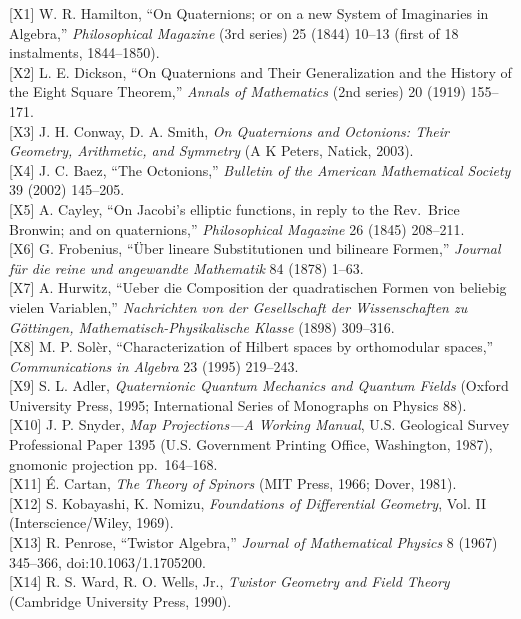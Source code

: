 \documentclass[
  a4paper,
]{article}
\begin{document}
{[}X1{]} W. R. Hamilton, ``On Quaternions; or on a new System of
Imaginaries in Algebra,'' \emph{Philosophical Magazine} (3rd series) 25
(1844) 10--13 (first of 18 instalments, 1844--1850).\\
{[}X2{]} L. E. Dickson, ``On Quaternions and Their Generalization and
the History of the Eight Square Theorem,'' \emph{Annals of Mathematics}
(2nd series) 20 (1919) 155--171.\\
{[}X3{]} J. H. Conway, D. A. Smith, \emph{On Quaternions and Octonions:
Their Geometry, Arithmetic, and Symmetry} (A K Peters, Natick, 2003).\\
{[}X4{]} J. C. Baez, ``The Octonions,'' \emph{Bulletin of the American
Mathematical Society} 39 (2002) 145--205.\\
{[}X5{]} A. Cayley, ``On Jacobi's elliptic functions, in reply to the
Rev.~Brice Bronwin; and on quaternions,'' \emph{Philosophical Magazine}
26 (1845) 208--211.\\
{[}X6{]} G. Frobenius, ``Über lineare Substitutionen und bilineare
Formen,'' \emph{Journal für die reine und angewandte Mathematik} 84
(1878) 1--63.\\
{[}X7{]} A. Hurwitz, ``Ueber die Composition der quadratischen Formen
von beliebig vielen Variablen,'' \emph{Nachrichten von der Gesellschaft
der Wissenschaften zu Göttingen, Mathematisch-Physikalische Klasse}
(1898) 309--316.\\
{[}X8{]} M. P. Solèr, ``Characterization of Hilbert spaces by
orthomodular spaces,'' \emph{Communications in Algebra} 23 (1995)
219--243.\\
{[}X9{]} S. L. Adler, \emph{Quaternionic Quantum Mechanics and Quantum
Fields} (Oxford University Press, 1995; International Series of
Monographs on Physics 88).\\
{[}X10{]} J. P. Snyder, \emph{Map Projections---A Working Manual}, U.S.
Geological Survey Professional Paper 1395 (U.S. Government Printing
Office, Washington, 1987), gnomonic projection pp.~164--168.\\
{[}X11{]} É. Cartan, \emph{The Theory of Spinors} (MIT Press, 1966;
Dover, 1981).\\
{[}X12{]} S. Kobayashi, K. Nomizu, \emph{Foundations of Differential
Geometry}, Vol. II (Interscience/Wiley, 1969).\\
{[}X13{]} R. Penrose, ``Twistor Algebra,'' \emph{Journal of Mathematical
Physics} 8 (1967) 345--366, doi:10.1063/1.1705200.\\
{[}X14{]} R. S. Ward, R. O. Wells, Jr., \emph{Twistor Geometry and Field
Theory} (Cambridge University Press, 1990).\\
\end{document}
